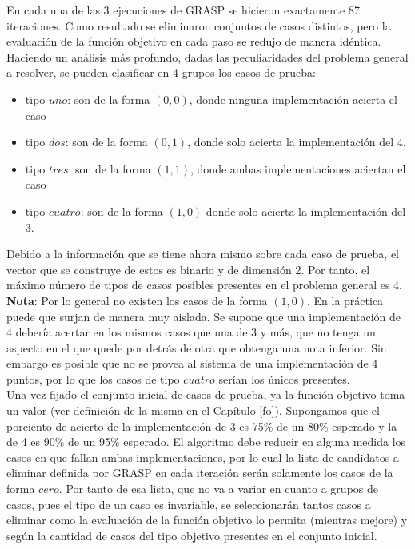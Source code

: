 \documentclass[a4paper,12pt]{book}
\begin{document}
	En cada una de las 3 ejecuciones de GRASP se hicieron exactamente 87 iteraciones. Como resultado se eliminaron conjuntos de casos distintos, pero la evaluación de la función objetivo en cada paso se redujo de manera idéntica. \\
	
	Haciendo un análisis más profundo, dadas las peculiaridades del problema general a resolver, se pueden clasificar en 4 grupos los casos de prueba:
	
	\begin{itemize}
		\item tipo $uno$: son de la forma $(0, 0)$, donde ninguna implementación acierta el caso
		\item tipo $dos$: son de la forma $(0, 1)$, donde solo acierta la implementación del 4.
		\item tipo $tres$: son de la forma $(1, 1)$, donde ambas implementaciones aciertan el caso
		\item tipo $cuatro$: son de la forma $(1, 0)$ donde solo acierta la implementación del 3.
	\end{itemize}

	Debido a la información que se tiene ahora mismo sobre cada caso de prueba, el vector que se construye de estos es binario y de dimensión 2. Por tanto, el máximo número de tipos de casos posibles presentes en el problema general es 4.\\

	\textbf{Nota}: Por lo general no existen los casos de la forma $(1, 0)$. En la práctica puede que surjan de manera muy aislada. Se supone que una implementación de 4 debería acertar en los mismos casos que una de 3 y más, que no tenga un aspecto en el que quede por detrás de otra que obtenga una nota inferior. Sin embargo es posible que no se provea al sistema de una implementación de 4 puntos, por lo que los casos de tipo $cuatro$ serían los únicos presentes.\\
 
 	Una vez fijado el conjunto inicial de casos de prueba, ya la función objetivo toma un valor (ver definición de la misma en el Capítulo \ref{fo}). Supongamos que el porciento de acierto de la implementación de 3 es 75\% de un 80\% esperado y la de 4 es 90\% de un 95\% esperado. El algoritmo debe reducir en alguna medida los casos en que fallan ambas implementaciones, por lo cual la lista de candidatos a eliminar definida por GRASP en cada iteración serán solamente los casos de la forma $cero$. Por tanto de esa lista, que no va a variar en cuanto a grupos de casos, pues el tipo de un caso es invariable, se seleccionarán tantos casos a eliminar como la evaluación de la función objetivo lo permita (mientras mejore) y según la cantidad de casos del tipo objetivo presentes en el conjunto inicial.
 	
\end{document}
